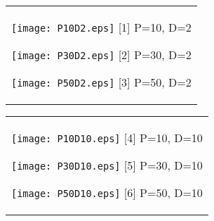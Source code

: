 \documentclass[a4paper,11pt,oneside,openany]{jsbook}
\begin{document}
\begin{figure}[htbp]
  \begin{center}
    \begin{tabular}{c}


      \begin{minipage}{0.33\hsize}
        \begin{center}
          \texttt{[image: P10D2.eps]}
          \hspace{1.2cm} [1] P=10, D=2
        \end{center}
      \end{minipage}

      \begin{minipage}{0.33\hsize}
        \begin{center}
          \texttt{[image: P30D2.eps]}
          \hspace{1.2cm} [2] P=30, D=2
        \end{center}
      \end{minipage}

      \begin{minipage}{0.33\hsize}
        \begin{center}
          \texttt{[image: P50D2.eps]}
          \hspace{1.2cm} [3] P=50, D=2
        \end{center}
      \end{minipage}
    \end{tabular}
  \end{center}
\end{figure}
\begin{figure}[htbp]
  \begin{center}
    \begin{tabular}{c}


      \begin{minipage}{0.33\hsize}
        \begin{center}
          \texttt{[image: P10D10.eps]}
          \hspace{1.2cm} [4] P=10, D=10
        \end{center}
      \end{minipage}

      \begin{minipage}{0.33\hsize}
        \begin{center}
          \texttt{[image: P30D10.eps]}
          \hspace{1.2cm} [5] P=30, D=10
        \end{center}
      \end{minipage}

      \begin{minipage}{0.33\hsize}
        \begin{center}
          \texttt{[image: P50D10.eps]}
          \hspace{1.2cm} [6] P=50, D=10
        \end{center}
      \end{minipage}
    \end{tabular}
  \end{center}
\end{figure}
\end{document}
